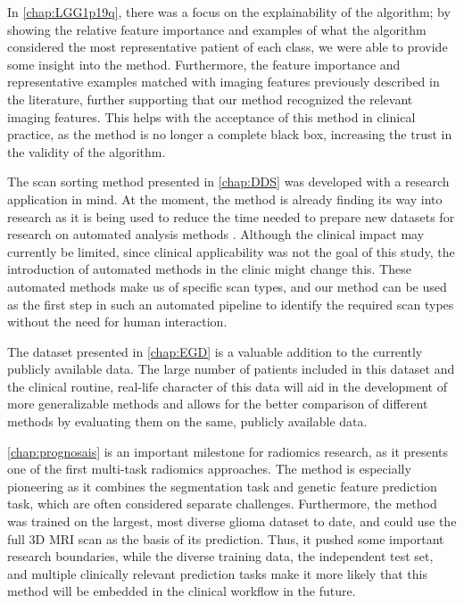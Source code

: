 In \cref{chap:LGG1p19q}, there was a focus on the explainability of the algorithm; by showing the relative feature importance and examples of what the algorithm considered the most representative patient of each class, we were able to provide some insight into the method.
Furthermore, the feature importance and representative examples matched with imaging features previously described in the literature, further supporting that our method recognized the relevant imaging features.
This helps with the acceptance of this method in clinical practice, as the method is no longer a complete black box, increasing the trust in the validity of the algorithm.

The scan sorting method presented in \cref{chap:DDS} was developed with a research application in mind.
At the moment, the method is already finding its way into research as it is being used to reduce the time needed to prepare new datasets for research on automated analysis methods \autocite{garderen2020mgmt}.
Although the clinical impact may currently be limited, since clinical applicability was not the goal of this study, the introduction of automated methods in the clinic might change this.
These automated methods make us of specific scan types, and our method can be used as the first step in such an automated pipeline to identify the required scan types without the need for human interaction.

The dataset presented in \cref{chap:EGD} is a valuable addition to the currently publicly available data.
The large number of patients included in this dataset and the clinical routine, real-life character of this data will aid in the development of more generalizable methods and allows for the better comparison of different methods by evaluating them on the same, publicly available data.

\cref{chap:prognosais} is an important milestone for radiomics research, as it presents one of the first multi-task radiomics approaches.
The method is especially pioneering as it combines the segmentation task and genetic feature prediction task, which are often considered separate challenges.
Furthermore, the method was trained on the largest, most diverse glioma dataset to date, and could use the full 3D \gls{MRI} scan as the basis of its prediction.
Thus, it pushed some important research boundaries, while the diverse training data, the independent test set, and multiple clinically relevant prediction tasks make it more likely that this method will be embedded in the clinical workflow in the future.


